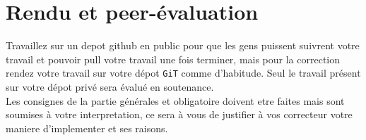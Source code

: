 \documentclass{42-fr}
\begin{document}



\chapter{Rendu et peer-\'evaluation}

	Travaillez sur un depot github en public pour que les gens puissent suivrent
	votre travail et pouvoir pull votre travail une fois terminer, mais pour la
	correction rendez votre travail sur votre d\'epot \texttt{GiT} comme d'habitude.
	Seul le travail pr\'esent sur votre d\'epot priv\'e sera \'evalu\'e en soutenance.\\
	Les consignes de la partie g\'en\'erales et obligatoire doivent etre faites
	mais sont soumises \`a votre interpretation, ce sera \`a vous de justifier
	\`a vos correcteur votre maniere d'implementer et ses raisons.




\end{document}
